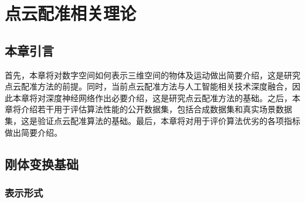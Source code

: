 \chapter{点云配准相关理论}
\thispagestyle{others}
\pagestyle{others}
\xiaosi

\section{本章引言}
首先，本章将对数字空间如何表示三维空间的物体及运动做出简要介绍，这是研究点云配准方法的前提。同时，当前点云配准方法与人工智能相关技术深度融合，因此本章将对深度神经网络作出必要介绍，这是研究点云配准方法的基础。之后，本章将介绍若干用于评估算法性能的公开数据集，包括合成数据集和真实场景数据集，这是验证点云配准算法的基础。最后，本章将对用于评价算法优劣的各项指标做出简要介绍。

\section{刚体变换基础}
    \subsection{表示形式}
